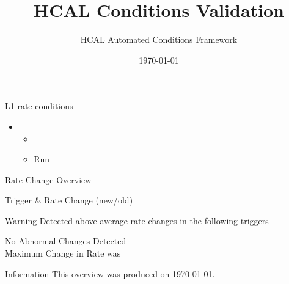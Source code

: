 \documentclass{beamer}
\title{HCAL Conditions Validation}
\author{HCAL Automated Conditions Framework}
\institute{CERN}
\date{\today}
\begin{document}
\frame{\titlepage}





\begin{frame}{L1 rate conditions}
    \begin{itemize}
        \item {}
            \begin{itemize}
                \item {}
                \item Run
            \end{itemize}
    \end{itemize}

\end{frame}


\begin{frame}{Rate Change Overview}

\begin{center}
        Trigger & Rate Change (new/old) \\ \hline
          

    \begin{alertblock}{Warning}
        \large Detected above average rate changes in the following triggers\\
         
    \end{alertblock}
    \centering
    \Large No Abnormal Changes Detected \\
    Maximum Change in Rate was 
\end{center}

\end{frame}



\begin{frame}{Information}
    This overview was produced on \today.\\
\end{frame}
\end{document}
